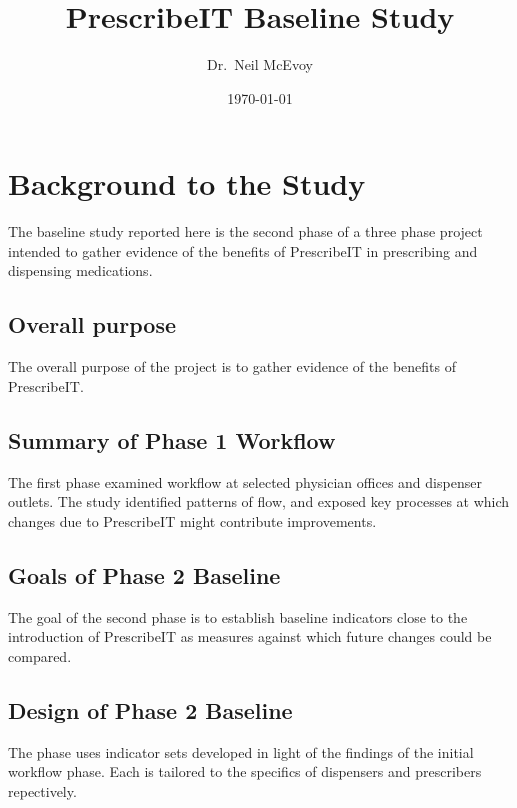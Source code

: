 \documentclass[10,letterpaper,]{article}
\title{PrescribeIT Baseline Study}
\author{Dr.~Neil McEvoy}
\date{\today}
\begin{document}
\renewcommand{\contentsname}{Contents}

\renewcommand{\pagename}{Page}


\maketitle

\tableofcontents
{} \clearpage

\section{Background to the Study}

The baseline study reported here is the second phase of a three phase
project intended to gather evidence of the benefits of PrescribeIT in
prescribing and dispensing medications.

\subsection{Overall purpose}

The overall purpose of the project is to gather evidence of the benefits
of PrescribeIT.

\subsection{Summary of Phase 1 Workflow}

The first phase examined workflow at selected physician offices and
dispenser outlets. The study identified patterns of flow, and exposed
key processes at which changes due to PrescribeIT might contribute
improvements.

\subsection{Goals of Phase 2 Baseline}

The goal of the second phase is to establish baseline indicators close
to the introduction of PrescribeIT as measures against which future
changes could be compared.

\subsection{Design of Phase 2 Baseline}

The phase uses indicator sets developed in light of the findings of the
initial workflow phase. Each is tailored to the specifics of dispensers
and prescribers repectively.
\end{document}

